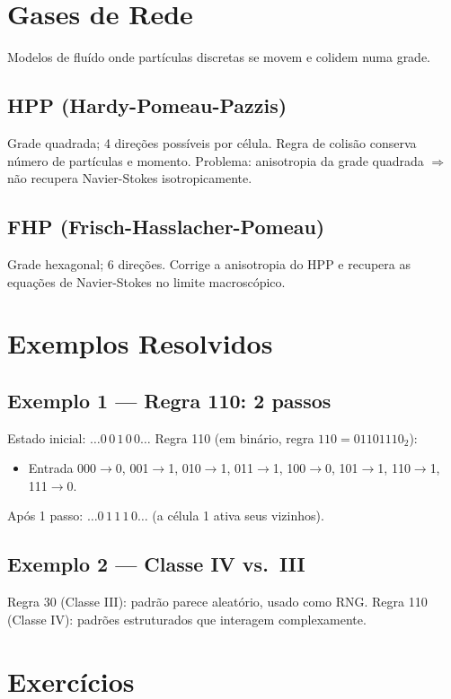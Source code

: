 \documentclass[12pt,a4paper]{article}
\begin{document}
\section*{Gases de Rede}

Modelos de flu\'ido onde part\'iculas discretas se movem e colidem numa grade.

\subsection*{HPP (Hardy-Pomeau-Pazzis)}
Grade quadrada; 4 dire\c{c}\~oes poss\'iveis por c\'elula. Regra de colis\~ao conserva n\'umero de part\'iculas e momento. Problema: anisotropia da grade quadrada $\Rightarrow$ n\~ao recupera Navier-Stokes isotropicamente.

\subsection*{FHP (Frisch-Hasslacher-Pomeau)}
Grade hexagonal; 6 dire\c{c}\~oes. Corrige a anisotropia do HPP e recupera as equa\c{c}\~oes de Navier-Stokes no limite macrosc\'opico.

\section*{Exemplos Resolvidos}

\subsection*{Exemplo 1 --- Regra 110: 2 passos}
Estado inicial: $\ldots0\,0\,1\,0\,0\ldots$
Regra 110 (em bin\'ario, regra $110 = 01101110_2$):
\begin{itemize}
  \item Entrada 000$\to$0, 001$\to$1, 010$\to$1, 011$\to$1, 100$\to$0, 101$\to$1, 110$\to$1, 111$\to$0.
\end{itemize}
Ap\'os 1 passo: $\ldots0\,1\,1\,1\,0\ldots$ (a c\'elula 1 ativa seus vizinhos).

\subsection*{Exemplo 2 --- Classe IV vs.\ III}
Regra 30 (Classe III): padr\~ao parece aleat\'orio, usado como RNG.
Regra 110 (Classe IV): padr\~oes estruturados que interagem complexamente.

\section*{Exerc\'icios}
\end{document}
